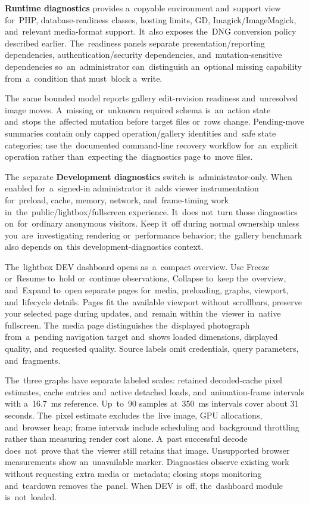 \documentclass[11pt,a4paper]{article}
\newcommand{\ui}[1]{\textbf{#1}}
\begin{document}
\ui{Runtime diagnostics} provides a~copyable environment and~support view
for~PHP, database-readiness classes, hosting limits, GD, Imagick/ImageMagick,
and~relevant media-format support. It~also exposes the~DNG conversion policy
described earlier. The~readiness panels separate presentation/reporting
dependencies, authentication/security dependencies, and~mutation-sensitive
dependencies so~an~administrator can~distinguish an~optional missing capability
from~a~condition that must~block a~write.

The~same bounded model reports gallery edit-revision readiness and~unresolved
image moves. A~missing or~unknown required schema is~an~action state and~stops
the~affected mutation before target files or~rows change. Pending-move summaries
contain only capped operation/gallery identities and~safe state categories; use
the~documented command-line recovery workflow for~an~explicit operation rather
than~expecting the~diagnostics page to~move files.

The~separate \ui{Development diagnostics} switch is~administrator-only. When
enabled for~a~signed-in administrator it~adds viewer instrumentation
for~preload, cache, memory, network, and~frame-timing work
in~the~public/lightbox/fullscreen experience. It~does not~turn those diagnostics
on~for~ordinary anonymous visitors. Keep it~off during normal ownership unless
you~are~investigating rendering or~performance behavior; the~gallery benchmark
also depends on~this development-diagnostics context.

The~lightbox DEV dashboard opens as~a~compact overview. Use Freeze or~Resume
to~hold or~continue observations, Collapse to~keep the~overview, and~Expand
to~open separate pages for~media, preloading, graphs, viewport, and~lifecycle
details. Pages fit the~available viewport without scrollbars, preserve your
selected page during updates, and~remain within the~viewer in~native fullscreen.
The~media page distinguishes the~displayed photograph from~a~pending navigation
target and~shows loaded dimensions, displayed quality, and~requested quality.
Source labels omit credentials, query parameters, and~fragments.

The~three graphs have separate labeled scales: retained decoded-cache pixel
estimates, cache entries and~active detached loads, and~animation-frame
intervals with a~16.7~ms reference. Up~to~90 samples at~350~ms intervals cover
about 31 seconds. The~pixel estimate excludes the~live image, GPU allocations,
and~browser heap; frame intervals include scheduling and~background throttling
rather than measuring render cost alone. A~past successful decode does~not~prove
that the~viewer still retains that image. Unsupported browser measurements show
an~unavailable marker. Diagnostics observe existing work without requesting
extra media or~metadata; closing stops monitoring and~teardown removes
the~panel. When DEV is~off, the~dashboard module is~not~loaded.
\end{document}
